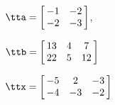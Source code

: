 {$\tta = \left[\hskip -3pt \begin{array}{cc} -1&-2 \\    -2&-3 \end{array}\hskip -3pt \right] $, 

$\ttb=\left[\hskip -3pt \begin{array}{ccc} 13&4&7\\    22&5&12  \end{array}\hskip -3pt \right] $}
{$\ttx=\left[\hskip -3pt \begin{array}{ccc} -5&2&-3\\    -4&-3&-2  \end{array}\hskip -3pt \right] $}
